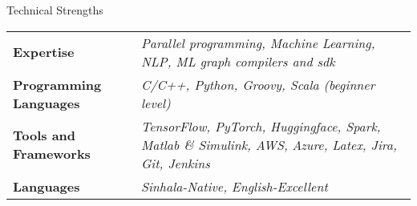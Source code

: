 \documentclass[
	11pt, %
]{./../assets/resume} %
\begin{document}





\begin{rSection}{Technical Strengths}

	\def\arraystretch{1.5}

	\begin{tabular}{ l p{10cm}}
		\textbf{Expertise} & \emph{Parallel programming, Machine Learning, NLP, ML graph compilers and sdk} \\
		\textbf{Programming Languages} & \emph{C/C++, Python, Groovy, Scala (beginner level)} \\
		\textbf{Tools and Frameworks} & \emph{TensorFlow, PyTorch, Huggingface, Spark, Matlab \& Simulink, AWS,} \emph{Azure, Latex, Jira, Git, Jenkins} \\
		\textbf{Languages} & \emph{Sinhala-Native, English-Excellent} \\
	\end{tabular}

\end{rSection}
\end{document}
